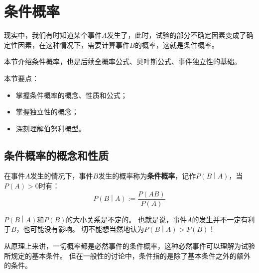 \section{条件概率}

\begin{tcolorbox}
现实中，我们有时知道某个事件$A$发生了，此时，试验的部分不确定因素变成了确定性因素，在这种情况下，需要计算事件$B$的概率，这就是条件概率。
\end{tcolorbox}

本节介绍条件概率，也是后续全概率公式、贝叶斯公式、事件独立性的基础。

本节要点：
\begin{itemize}
    \item 掌握条件概率的概念、性质和公式；
    \item 掌握独立性的概念；
    \item 深刻理解伯努利概型。
\end{itemize}

\subsection{条件概率的概念和性质}

\begin{definition}[条件概率]
在事件$A$发生的情况下，事件$B$发生的概率称为{\bf 条件概率}，记作$P\left( B \middle| A \right) $，当$P\left( A \right) >0$时有：
\[
P\left( B \middle| A \right) := \frac{P\left( AB \right)}{P\left( A \right)}
\]
\end{definition}

$P\left( B \middle| A \right) $和$P\left( B \right) $的大小关系是不定的。
也就是说，事件$A$的发生并不一定有利于$B$，也可能没有影响。
切不能想当然地认为$P\left( B \middle| A \right) >P\left( B \right) $！

从原理上来讲，一切概率都是必然事件的条件概率，这种必然事件可以理解为试验所规定的基本条件。
但在一般性的讨论中，条件指的是除了基本条件之外的额外的条件。

~

